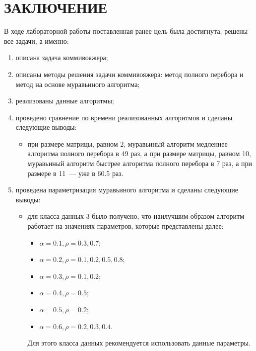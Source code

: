 \chapter*{\hfill{\centering  ЗАКЛЮЧЕНИЕ}\hfill}

В ходе лабораторной работы поставленная ранее цель была достигнута, решены все задачи, а именно:
\begin{enumerate}
	\item описана задача коммивояжера;
	\item описаны методы решения задачи коммивояжера: метод полного перебора и метод на основе муравьиного алгоритма;
	\item реализованы данные алгоритмы;
	\item проведено сравнение по времени реализованных алгоритмов и сделаны следующие выводы:
	\begin{itemize}
		\item при размере матрицы, равном 2, муравьиный алгоритм медленнее алгоритма полного перебора в 49 раз, а при размере матрицы, равном 10, муравьиный алгоритм быстрее алгоритма полного перебора в 7 раз, а при размере в 11~--- уже в 60.5 раз.
	\end{itemize}
	\item проведена параметризация муравьиного алгоритма и сделаны следующие выводы:
	\begin{itemize}
		\item для класса данных 3 было получено, что наилучшим образом алгоритм работает на значениях параметров, которые представлены далее:
		\begin{itemize}[label=---]
			\item $\alpha = 0.1, \rho = 0.3, 0.7$;
			\item $\alpha = 0.2, \rho = 0.1, 0.2, 0.5, 0.8$;
			\item $\alpha = 0.3, \rho = 0.1, 0.2$;
			\item $\alpha = 0.4, \rho = 0.5$;
			\item $\alpha = 0.5, \rho = 0.2$;
			\item $\alpha = 0.6, \rho = 0.2, 0.3, 0.4$.
		\end{itemize} 
		
		Для этого класса данных рекомендуется использовать данные параметры.
	\end{itemize}
\end{enumerate}